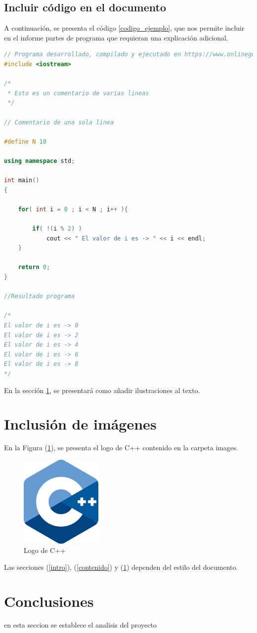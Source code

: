 \documentclass{article}
\begin{document}
\subsection{Incluir código en el documento}
%
A continuación, se presenta el código \ref{codigo_ejemplo}, que nos permite incluir en el informe partes de programa que requieran una explicación adicional.
\begin{lstlisting}[language=C++, label=codigo_ejemplo]
// Programa desarrollado, compilado y ejecutado en https://www.onlinegdb.com
#include <iostream>

/*
 * Esto es un comentario de varias lineas
 */

// Comentario de una sola linea

#define N 10

using namespace std;

int main()
{
    
    for( int i = 0 ; i < N ; i++ ){
        
        if( !(i % 2) )
            cout << " El valor de i es -> " << i << endl;
    }
    
    return 0;
}

//Resultado programa

/*
El valor de i es -> 0
El valor de i es -> 2
El valor de i es -> 4
El valor de i es -> 6
El valor de i es -> 8
*/
\end{lstlisting}
En la sección \ref{imagenes}, se presentará como añadir ilustraciones al texto.

\section{Inclusión de imágenes} \label{imagenes}

En la Figura (\ref{fig:cpplogo}), se presenta el logo de C++ contenido en la carpeta images.

\begin{figure}[h]
\includegraphics[width=4cm]{cpplogo.png}
\centering
\caption{Logo de C++}
\label{fig:cpplogo}
\end{figure}

Las secciones (\ref{intro}), (\ref{contenido}) y (\ref{imagenes}) dependen del estilo del documento.

\section{Conclusiones} \label{Conclusiones}
en esta seccion se establece el analisis del proyecto



\end{document}
